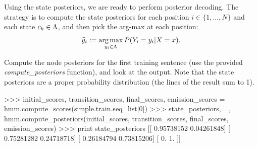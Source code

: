 Using the state posteriors, we are ready to perform posterior
decoding. 
The strategy is to compute the state posteriors 
for each position $i \in \{1,\ldots,N\}$
and each state $c_k \in \Lambda$, and 
then pick the arg-max at each position:
\begin{equation}
{\widehat y_i} := \operatorname*{arg\,max}_{y_i \in \Lambda} P(Y_i=y_i| X=x).
\end{equation}





\begin{exercise}

Compute the node posteriors for the first training sentence (use the provided \emph{compute\_posteriors} function), and look at
the output. Note that the state posteriors are a proper
probability distribution (the lines of the result sum to 1).

\begin{python}
>>> initial_scores, transition_scores, final_scores, emission_scores = hmm.compute_scores(simple.train.seq_list[0])
>>> state_posteriors, _, _ = hmm.compute_posteriors(initial_scores,
                                                    transition_scores,
                                                    final_scores,
                                                    emission_scores)
>>> print state_posteriors
[[ 0.95738152  0.04261848]
 [ 0.75281282  0.24718718]
 [ 0.26184794  0.73815206]
 [ 0.          1.        ]]
\end{python}
\end{exercise}

